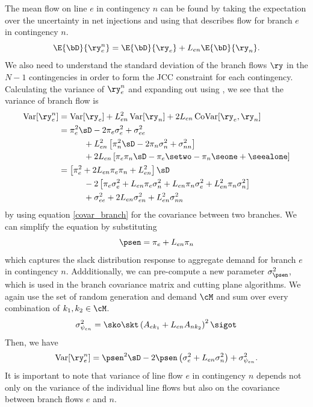 The mean flow on line $e$ in contingency $n$ can be found by taking the expectation over the uncertainty in net injections and using  that describes flow for branch $e$ in contingency $n$.
\begin{equation}
\E{\bD}{\ry_e^n} =  \E{\bD}{\ry_e}  + L_{en} \E{\bD}{\ry_n}.
\end{equation}
We also need to understand the standard deviation of the branch flows $\ry$  in the $N-1$ contingencies in order to form the JCC constraint for each contingency.  Calculating the variance of $\ry_e^n$ and expanding out using , we see that the variance of branch flow is
\begin{subequations}
\begin{align}
 \operatorname{Var}[\ry_e^n] &= \operatorname{Var}[\ry_e] + L^2_{e n} \operatorname{Var}[ \ry_n ] + 2 L_{e n} \operatorname{CoVar}[ \ry_e, \ry_n ] \\
 &= \pi_e^2 \sD - 2 \pi_e \sigma^2_e + \sigma^2_{ee} \nonumber \\
 &\hspace{30pt} + L_{en}^2 \left[ \pi_n^2 \sD - 2 \pi_n \sigma^2_n + \sigma^2_{nn} \right] \nonumber \\
 &\hspace{30pt}+ 2 L_{en} \left[ \pi_{e} \pi_{n} \sD -  \pi_{e} \setwo - \pi_{n} \seone   + \seealone \right]  \\
 &= \left[ \pi_e^2 + 2 L_{en} \pi_e \pi_n + L_{en}^2 \right] \sD \nonumber\\
 &\hspace{30pt} - 2 \left[ \pi_e \sigma^2_e + L_{en} \pi_e \sigma^2_n + L_{en} \pi_n \sigma^2_e + L_{en}^2 \pi_n \sigma^2_n \right]  \nonumber \\
&\hspace{30pt} +  \sigma^2_{ee} + 2 L_{en} \sigma^2_{en} + L_{en}^2 \sigma^2_{nn}
\end{align}
\end{subequations}
by using equation \ref{covar_branch} for the covariance between two branches.  We can simplify the equation by substituting
\begin{equation}
\psen = \pi_e + L_{en} \pi_n
\end{equation}
 which captures the slack distribution response to aggregate demand for branch $e$ in contingency $n$. Addditionally, we can pre-compute a new parameter $\sigma^2_{\psen}$, which is used in the branch covariance matrix and cutting plane algorithms.  We again use the set of random generation and demand $\cM$ and sum over every combination of $k_1,k_2 \in \cM$.
\begin{equation}
\sigma^2_{\psi_{en}} = \sko \skt \left(A_{ek_1} + L_{en} A_{nk_2}\right)^2 \sigot
\end{equation} 
Then, we have
\begin{equation}\label{n1var}
\operatorname{Var}[\ry_e^n] =\psen^2 \sD - 2 \psen \left( \sigma^2_e + L_{en} \sigma^2_n \right) + \sigma^2_{\psi_{en}}.
\end{equation}
  It is important to note that variance of line flow $e$ in contingency $n$ depends not only on the variance of the individual line flows but also on the covariance between branch flows $e$ and $n$.  

